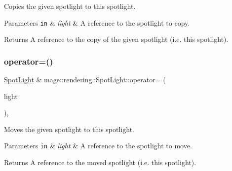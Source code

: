 Copies the given spotlight to this spotlight.


\begin{DoxyParams}[1]{Parameters}
\mbox{\tt in}  & {\em light} & A reference to the spotlight to copy. \\
\hline
\end{DoxyParams}
\begin{DoxyReturn}{Returns}
A reference to the copy of the given spotlight (i.\+e. this spotlight). 
\end{DoxyReturn}
\hypertarget{classmage_1_1rendering_1_1_spot_light_a58ff20b0459ccd6df54c85a361faa5ad}{}\label{classmage_1_1rendering_1_1_spot_light_a58ff20b0459ccd6df54c85a361faa5ad} 
\subsubsection{\texorpdfstring{operator=()}{operator=()}\hspace{0.1cm}{\footnotesize\ttfamily [2/2]}}
{\footnotesize\ttfamily \hyperlink{classmage_1_1rendering_1_1_spot_light}{Spot\+Light} \& mage\+::rendering\+::\+Spot\+Light\+::operator= (\begin{DoxyParamCaption}\item[{\hyperlink{classmage_1_1rendering_1_1_spot_light}{Spot\+Light} \&\&}]{light }\end{DoxyParamCaption})\hspace{0.3cm}{\ttfamily [default]}, {\ttfamily [noexcept]}}

Moves the given spotlight to this spotlight.


\begin{DoxyParams}[1]{Parameters}
\mbox{\tt in}  & {\em light} & A reference to the spotlight to move. \\
\hline
\end{DoxyParams}
\begin{DoxyReturn}{Returns}
A reference to the moved spotlight (i.\+e. this spotlight). 
\end{DoxyReturn}
\hypertarget{classmage_1_1rendering_1_1_spot_light_a92a3b92e8a789c038c0f9058b1ff5a48}{}\label{classmage_1_1rendering_1_1_spot_light_a92a3b92e8a789c038c0f9058b1ff5a48} 
